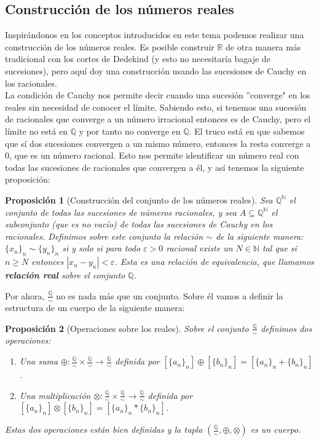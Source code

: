 \documentclass{article}
\newtheorem{prop}{Proposición}
\newcommand{\reales}{\mathbb{R}}
\newcommand{\naturales}{\mathbb{N}}
\newcommand{\racionales}{\mathbb{Q}}
\newcommand{\protoreales}{\frac{\racionales}{\sim}}
\newcommand{\sucesion}[1]{\{ #1 _n \}_n}
\begin{document}
\subsection{Construcción de los números reales}
Inspirándonos en los conceptos introducidos en este tema podemos realizar una construcción de los números reales. Es posible construir $\reales$ de otra manera más tradicional con los cortes de Dedekind (y esto no necesitaría bagaje de sucesiones), pero aquí doy una construcción usando las sucesiones de Cauchy en los racionales.\\ 
La condición de Cauchy nos permite decir cuando una sucesión ''converge" en los reales sin necesidad de conocer el límite. Sabiendo esto, si tenemos una sucesión de racionales que converge a un número irracional entonces es de Cauchy, pero el límite no está en $\racionales$ y por tanto no converge en $\racionales$. El truco está en que sabemos que sí dos sucesiones convergen a un mismo número, entonces la resta converge a $0$, que es un número racional. Esto nos permite identificar un número real con todas las sucesiones de racionales que convergen a él, y así tenemos la siguiente proposición:
\begin{prop}[Construcción del conjunto de los números reales]
	\label{prop_consreal1}
	Sea $\racionales ^ {\naturales}$ el conjunto de todas las sucesiones de números racionales, y sea $A \subseteq \racionales ^ {\naturales}$ el subconjunto (que es no vacío) de todas las sucesiones de Cauchy en los racionales. Definimos sobre este conjunto la relación $\sim$ de la siguiente manera: $\sucesion{x} \sim \sucesion{y}$ si y solo si para todo $\varepsilon > 0$ racional existe un $N \in \naturales$ tal que si $n \geq N$ entonces $|x_n - y_n| < \varepsilon$. Esta es una relación de equivalencia, que llamamos \textbf{relación real} sobre el conjunto $\racionales$.
\end{prop}
Por ahora, $\frac{\racionales}{\sim}$ no es nada más que un conjunto. Sobre él vamos a definir la estructura de un cuerpo de la siguiente manera:
\begin{prop}[Operaciones sobre los reales]
	Sobre el conjunto $\frac{\racionales}{\sim}$ definimos dos operaciones:
	\begin{enumerate}
		\item
		Una suma $\oplus: \protoreales \times \protoreales \rightarrow \protoreales$ definida por $[\sucesion{a}] \oplus [\sucesion{b}] = [\sucesion{a} + \sucesion{b}]$.
		\item
		Una multiplicación $\otimes: \protoreales \times \protoreales \rightarrow \protoreales$ definida por $[\sucesion{a}] \otimes [\sucesion{b}] = [\sucesion{a} * \sucesion{b}]$.
	\end{enumerate}
	Estas dos operaciones están bien definidas y la tupla $(\protoreales, \oplus, \otimes)$ es un cuerpo.
\end{prop}
\end{document}
